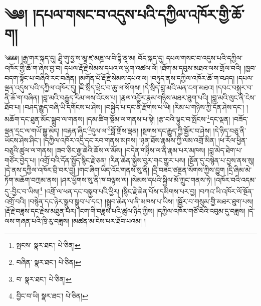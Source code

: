 \setcounter{footnote}{0} 
\chapter{༄༅། །དཔལ་གསང་བ་འདུས་པའི་དཀྱིལ་འཁོར་གྱི་ཆོ་ག།}༄༅༅། །རྒྱ་གར་སྐད་དུ། ཤྲཱི་གུ་ཧྱ་ས་མཱ་ཛ་མཎྜ་ལ་བི་དྷི་ནཱ་མ། བོད་སྐད་དུ། དཔལ་གསང་བ་འདུས་པའི་དཀྱིལ་འཁོར་གྱི་ཆོ་ག་ཞེས་བྱ་བ། དཔལ་རྡོ་རྗེ་སེམས་དཔའ་ལ་ཕྱག་འཚལ་ལོ། །ཐོག་མ་དབུས་མཐའ་ལས་གྲོལ་བའི། །ཁྱབ་བདག་སྟོང་པ་བཞིའི་རང་བཞིན། །མགོན་པོ་རྡོ་རྗེ་སེམས་དཔའ་ལ། །བཏུད་ནས་དཀྱིལ་འཁོར་ཆོ་ག་བཤད། །དཔལ་ལྡན་འདུས་པའི་དཀྱིལ་འཁོར་དུ། །ཇི་སྲིད་ཕྲེང་བ་ཆུ་ལ་སོགས། །དེ་སྲིད་བླ་མའི་མན་ངག་མཐའ། །དབང་བསྐུར་བ་ནི་ཆོ་ག་བཞིན། །བླ་མའི་བརྒྱུད་རིམ་ལས་འོངས་པ། །རྣལ་འབྱོར་རྣམ་གཉིས་མཐར་ཐུག་པའི། །བླ་མའི་ལུང་ནི་ངེས་ཐོབ་པ། །བཤད་རྒྱུད་བཞི་ཡི་དགོངས་པ་ཤེས། །བསྐྱེད་པ་དང་ནི་རྫོགས་པ་ཡི། །རིམ་པ་གཉིས་ཀྱི་དོན་ཤེས་དང་། །མཆོག་དང་ཐུན་མོང་སྒྲུབ་ལ་གནས། །དམ་ཚིག་སྡོམ་ལ་གནས་པ་སྟེ། །རྩ་བའི་ལྟུང་བ་སྤོངས་\footnote{སྤངས་  སྣར་ཐང་།  པེ་ཅིན། }དང་ལྡན། །བཟོད་ལྡན་དྲང་ལ་གཡོ་སྒྱུ་མེད། །བརྟན་ཞིང་\footnote{བཞིན་  སྣར་ཐང་།  པེ་ཅིན། }དུལ་ལ་\footnote{བ་  སྣར་ཐང་།  པེ་ཅིན། }བློ་གྲོས་ལྡན། །སྔགས་དང་རྒྱུད་ཀྱི་སྦྱོར་བ་ཤེས། །དེ་ཉིད་བཅུ་ནི་ཡོངས་ཤེས་ཤིང་། །དཀྱིལ་འཁོར་འདྲི་དང་རབ་གནས་མཁས། །ཉན་ཐོས་རྣམས་ཀྱི་ལམ་འགྲོ་མིན། །ཕ་རོལ་ཕྱིན་བཅུའི་ཚུལ་ལ་གནས། །ཟབ་ཅིང་རྒྱ་ཆེའི་ཆོས་ལ་མོས། །བདེན་གཉིས་ལ་ནི་རྣམ་པར་མཁས། །བླ་མེད་ཐེག་པ་གཙོར་བྱེད་པ། །འགྲོ་བའི་དོན་སྤྱོད་སྙིང་རྗེ་ཅན། །རིན་ཆེན་སྐྱེས་བུར་གང་གྱུར་པས། །སྔོན་དུ་བསྙེན་པ་བྱས་ནས་སུ། །དེ་ནས་དཀྱིལ་འཁོར་བྲི་བར་བྱ། །གང་ཞིག་ཡིད་འོང་གནས་སུ་ནི། །དྲི་བཟང་ཙནྡན་སོགས་ཀྱིས་བྱུག །དྲི་ཞིམ་མེ་ཏོག་མཆོག་བཀྲམ་ནས། །ཤར་ཕྱོགས་སུ་ནི་ཁ་བལྟས་ལ། །སེམས་དཔའི་སྐྱིལ་མོ་ཀྲུང་གནས་ཏེ། །འཁོར་བའི་འདམ་དུ་:བྱིང་བ་ཡིས།\footnote{བྱིང་བ་ཡི།  སྣར་ཐང་།  པེ་ཅིན། } །འགྲོ་ལ་ཕན་དང་བསྐྱབ་པའི་ཕྱིར། །སྙིང་རྗེ་ཆེན་པོས་དམིགས་པར་བྱ། །བཀའ་ཡི་འཁོར་ལོ་སྔོན་འགྲོ་བའི། །བསྙེན་དང་ཉེར་སྒྲུབ་སྒྲུབ་པ་དང་། །སྒྲུབ་ཆེན་ལ་ནི་མཁས་པ་ཡིས། །སྦྱོར་བ་གསུམ་གྱི་མཐར་ཐུག་པས། །རྡོ་རྗེ་བཟླས་དང་རྗེས་མཐུན་པར། །ངག་གི་བཟླས་པའི་ཚུལ་ཉིད་ཀྱིས། །དཀྱིལ་འཁོར་གཙོ་བོའི་འབུམ་དུ་བཟླས། །དེ་ལས་གཞན་པའི་ཁྲི་རུ་བཟླས། །མཚན་མ་ངེས་པར་ཐོབ་པའམ། །
